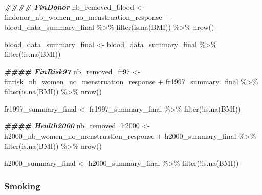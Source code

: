 \documentclass[
]{article}
\newenvironment{Shaded}{\begin{snugshade}}{\end{snugshade}}
\newcommand{\DocumentationTok}[1]{\textcolor[rgb]{0.56,0.35,0.01}{\textbf{\textit{#1}}}}
\newcommand{\FunctionTok}[1]{\textcolor[rgb]{0.00,0.00,0.00}{#1}}
\newcommand{\NormalTok}[1]{#1}
\newcommand{\OtherTok}[1]{\textcolor[rgb]{0.56,0.35,0.01}{#1}}
\newcommand{\SpecialCharTok}[1]{\textcolor[rgb]{0.00,0.00,0.00}{#1}}
\begin{document}
\begin{Shaded}
\begin{Highlighting}[]
\DocumentationTok{\#\#\#\# FinDonor}
\NormalTok{nb\_removed\_blood }\OtherTok{\textless{}{-}}\NormalTok{ findonor\_nb\_women\_no\_menstruation\_response }\SpecialCharTok{+}
\NormalTok{                            blood\_data\_summary\_final }\SpecialCharTok{\%\textgreater{}\%} \FunctionTok{filter}\NormalTok{(}\FunctionTok{is.na}\NormalTok{(BMI)) }\SpecialCharTok{\%\textgreater{}\%} \FunctionTok{nrow}\NormalTok{() }

\NormalTok{blood\_data\_summary\_final }\OtherTok{\textless{}{-}}\NormalTok{ blood\_data\_summary\_final }\SpecialCharTok{\%\textgreater{}\%} 
  \FunctionTok{filter}\NormalTok{(}\SpecialCharTok{!}\FunctionTok{is.na}\NormalTok{(BMI))}

\DocumentationTok{\#\#\#\# FinRisk97}
\NormalTok{nb\_removed\_fr97 }\OtherTok{\textless{}{-}}\NormalTok{ finrisk\_nb\_women\_no\_menstruation\_response }\SpecialCharTok{+}
\NormalTok{                            fr1997\_summary\_final }\SpecialCharTok{\%\textgreater{}\%} \FunctionTok{filter}\NormalTok{(}\FunctionTok{is.na}\NormalTok{(BMI)) }\SpecialCharTok{\%\textgreater{}\%} \FunctionTok{nrow}\NormalTok{() }

\NormalTok{fr1997\_summary\_final }\OtherTok{\textless{}{-}}\NormalTok{ fr1997\_summary\_final }\SpecialCharTok{\%\textgreater{}\%} 
  \FunctionTok{filter}\NormalTok{(}\SpecialCharTok{!}\FunctionTok{is.na}\NormalTok{(BMI))}

\DocumentationTok{\#\#\#\# Health2000}
\NormalTok{nb\_removed\_h2000 }\OtherTok{\textless{}{-}}\NormalTok{ h2000\_nb\_women\_no\_menstruation\_response }\SpecialCharTok{+}
\NormalTok{                            h2000\_summary\_final }\SpecialCharTok{\%\textgreater{}\%} \FunctionTok{filter}\NormalTok{(}\FunctionTok{is.na}\NormalTok{(BMI)) }\SpecialCharTok{\%\textgreater{}\%} \FunctionTok{nrow}\NormalTok{() }

\NormalTok{h2000\_summary\_final }\OtherTok{\textless{}{-}}\NormalTok{ h2000\_summary\_final }\SpecialCharTok{\%\textgreater{}\%} 
  \FunctionTok{filter}\NormalTok{(}\SpecialCharTok{!}\FunctionTok{is.na}\NormalTok{(BMI))}
\end{Highlighting}
\end{Shaded}

\hypertarget{smoking}{%
\subsubsection{Smoking}\label{smoking}}
\end{document}
